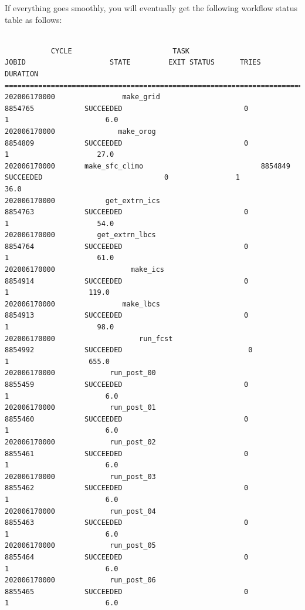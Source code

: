 \documentclass[11pt,fleqn]{report}              %
\begin{document}
If everything goes smoothly, you will eventually get the following workflow status table as follows:
\lstset{language=bash}   
\begin{lstlisting}[frame=trBL, basicstyle=\tiny]

           CYCLE                        TASK                                JOBID                    STATE         EXIT STATUS      TRIES         DURATION
====================================================================================================
202006170000                make_grid                            8854765            SUCCEEDED                             0                1                       6.0
202006170000               make_orog                            8854809            SUCCEEDED                             0                1                     27.0
202006170000       make_sfc_climo                            8854849            SUCCEEDED                             0                1             	     36.0
202006170000            get_extrn_ics                            8854763            SUCCEEDED                             0                1                     54.0
202006170000          get_extrn_lbcs                            8854764            SUCCEEDED                             0                1                     61.0
202006170000                  make_ics                            8854914            SUCCEEDED                             0                1                   119.0
202006170000                make_lbcs                            8854913            SUCCEEDED                             0                1                     98.0
202006170000                    run_fcst                            8854992            SUCCEEDED                              0               1                   655.0
202006170000             run_post_00                            8855459            SUCCEEDED                             0                1                       6.0
202006170000             run_post_01                            8855460            SUCCEEDED                             0                1                       6.0
202006170000             run_post_02                            8855461            SUCCEEDED                             0                1                       6.0
202006170000             run_post_03                            8855462            SUCCEEDED                             0                1                       6.0
202006170000             run_post_04                            8855463            SUCCEEDED                             0                1                       6.0
202006170000             run_post_05                            8855464            SUCCEEDED                             0                1                       6.0
202006170000             run_post_06                            8855465            SUCCEEDED                             0                1                       6.0

\end{lstlisting}
\end{document}

